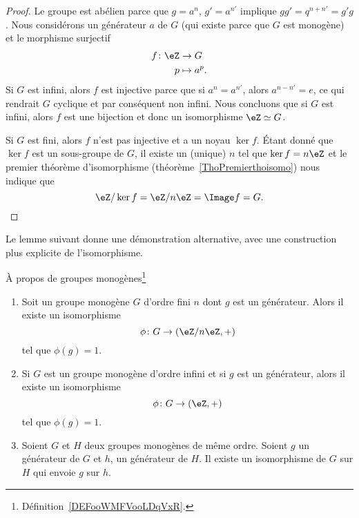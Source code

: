 \begin{proof}
	Le groupe est abélien parce que $g=a^n$, \( g'=a^{n'}\) implique \( gg'=q^{n+n'}=g'g\). Nous considérons un générateur \( a\) de \( G\) (qui existe parce que $G$ est monogène) et le morphisme surjectif
	\begin{equation}
		\begin{aligned}
			f\colon \eZ & \to G        \\
			p           & \mapsto a^p.
		\end{aligned}
	\end{equation}
	Si \( G\) est infini, alors \( f\) est injective parce que si \( a^n=a^{n'}\), alors \( a^{n-n'}=e\), ce qui rendrait \( G\) cyclique et par conséquent non infini. Nous concluons que si \( G\) est infini, alors \( f\) est une bijection et donc un isomorphisme \( \eZ\simeq G\).

	Si \( G\) est fini, alors \( f\) n'est pas injective et a un noyau \( \ker f\). Étant donné que \( \ker f\) est un sous-groupe de \( G\), il existe un (unique) \( n\) tel que \( \ker f=n\eZ\) et le premier théorème d'isomorphisme (théorème~\ref{ThoPremierthoisomo}) nous indique que
	\begin{equation}
		\eZ/\ker f=\eZ/n\eZ=\Image f=G.
	\end{equation}

\end{proof}

Le lemme suivant donne une démonstration alternative, avec une construction plus explicite de l'isomorphisme.

\begin{lemma}   \label{LemZhxMit}

	À propos de groupes monogènes\footnote{Définition~\ref{DEFooWMFVooLDqVxR}.}

	\begin{enumerate}
		\item


		      Soit un groupe monogène \( G\) d'ordre fini \( n\) dont \( g\) est un générateur. Alors il existe un isomorphisme
		      \begin{equation}
			      \phi\colon G\to (\eZ/n\eZ,+)
		      \end{equation}
		      tel que \( \phi(g)=1\).

		\item

		      Si \( G\) est un groupe monogène d'ordre infini et si \( g\) est un générateur, alors il existe un isomorphisme
		      \begin{equation}
			      \phi\colon G\to (\eZ,+)
		      \end{equation}
		      tel que \( \phi(g)=1\).

		\item

		      Soient \( G\) et \( H\) deux groupes monogènes de même ordre. Soient \( g\) un générateur de \( G\) et \( h\), un générateur de \( H\). Il existe un isomorphisme de \( G\) sur \( H\) qui envoie \( g\) sur \( h\).
	\end{enumerate}
\end{lemma}

